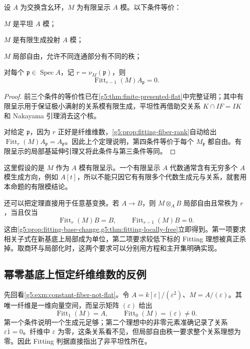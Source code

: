 \begin{proposition}\label{g5:prop:finitely-presented-flat}
	设 \(A\) 为交换含幺环，\(M\) 为有限呈示 \(A\) 模。以下条件等价：
	\begin{equivalences}
		\item \(M\) 是平坦 \(A\) 模；
		\item \(M\) 是有限生成投射 \(A\) 模；
		\item \(M\) 局部自由，允许不同连通部分有不同的秩；
		\item 对每个 \(\mathfrak p\in\operatorname{Spec}A\)，记 \(r=\nu_M(\mathfrak p)\)，则
		\[
			\operatorname{Fitt}_{r-1}(M)A_{\mathfrak p}=0.
		\]
	\end{equivalences}
\end{proposition}
\begin{proof}
	前三个条件的等价性已在\cref{g5:thm:finite-presented-flat}中完整证明；其中有限呈示用于保证极小满射的关系模有限生成，平坦性再借助交关系 \(K\cap IF=IK\) 和 Nakayama 引理消去这个核。

	对给定 \(\mathfrak p\)，因为 \(r\) 正好是纤维维数，\cref{g5:prop:fitting-fiber-rank}自动给出 \(\operatorname{Fitt}_r(M)A_{\mathfrak p}=A_{\mathfrak p}\)。因此上个定理说明，第四条件等价于每个 \(M_{\mathfrak p}\) 都自由。有限呈示的局部基延伸引理又将此条件与第三条件等同。
\end{proof}

这里假设的是 \(M\) 作为 \(A\) 模有限呈示。一个有限呈示 \(A\) 代数通常含有无穷多个 \(A\) 模生成方向，例如 \(A[t]\)，所以不能只因它有有限多个代数生成元与关系，就套用本命题的有限模结论。

\ProseParagraphBreak

还可以把定理直接用于任意基变换。若 \(A\to B\)，则 \(M\otimes_A B\) 局部自由且常秩为 \(r\)，当且仅当
\[
	\operatorname{Fitt}_r(M)B=B,
	\qquad\operatorname{Fitt}_{r-1}(M)B=0.
\]
这由\cref{g5:prop:fitting-base-change,g5:thm:fitting-locally-free}立即得到。第一项要求相关子式在新基底上局部成为单位，第二项要求较低下标的 Fitting 理想被真正杀掉。取商环与局部化时，这两个要求可以分别用方程和主开集明确实现。

\subsection{幂零基底上恒定纤维维数的反例}
\label{g5:subsec:0602:05}

先回看\cref{g5:exm:constant-fiber-not-flat}。令 \(A=k[\varepsilon]/(\varepsilon^2)\)、\(M=A/(\varepsilon)\)。其唯一纤维是一维向量空间，而呈示矩阵 \((\varepsilon)\) 给出
\[
	\operatorname{Fitt}_1(M)=A,
	\qquad\operatorname{Fitt}_0(M)=(\varepsilon)\ne0.
\]
第一个条件说明一个生成元足够；第二个理想中的非零元素准确记录了关系 \(\varepsilon\overline1=0\)。纤维中 \(\varepsilon\) 为零，这条关系看不见，但局部自由秩一要求整个关系理想为零。因此 Fitting 判据直接指出了非平坦性所在。

